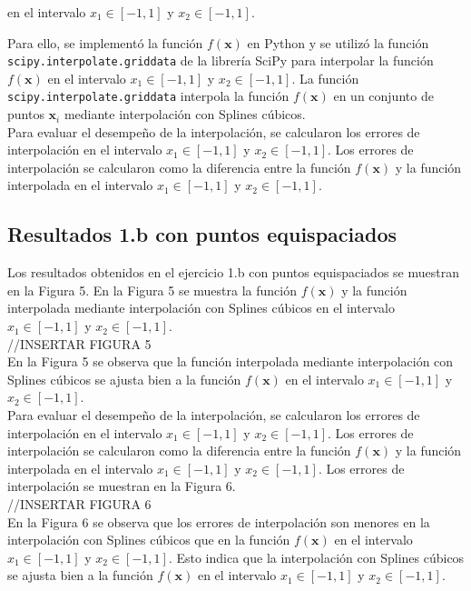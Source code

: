 en el intervalo $x_1 \in [-1, 1]$ y $x_2 \in [-1, 1]$.

Para ello, se implementó la función $f(\textbf{x})$ en Python y se utilizó la función \texttt{scipy.interpolate.griddata} de la librería SciPy para interpolar la función $f(\textbf{x})$ en el intervalo $x_1 \in [-1, 1]$ y $x_2 \in [-1, 1]$. 
La función \texttt{scipy.interpolate.griddata} interpola la función $f(\textbf{x})$ en un conjunto de puntos $\textbf{x}_i$ mediante interpolación con Splines cúbicos.\\
Para evaluar el desempeño de la interpolación, se calcularon los errores de interpolación en el intervalo $x_1 \in [-1, 1]$ y $x_2 \in [-1, 1]$. Los errores de interpolación se calcularon como la diferencia entre la función $f(\textbf{x})$ y la función interpolada en el intervalo $x_1 \in [-1, 1]$ y $x_2 \in [-1, 1]$.\\

\subsection{Resultados 1.b con puntos equispaciados}
Los resultados obtenidos en el ejercicio 1.b con puntos equispaciados se muestran en la Figura 5. En la Figura 5 se muestra la función $f(\textbf{x})$ y la función interpolada mediante interpolación con Splines cúbicos en el intervalo $x_1 \in [-1, 1]$ y $x_2 \in [-1, 1]$.\\
//INSERTAR FIGURA 5\\
En la Figura 5 se observa que la función interpolada mediante interpolación con Splines cúbicos se ajusta bien a la función $f(\textbf{x})$ en el intervalo $x_1 \in [-1, 1]$ y $x_2 \in [-1, 1]$.\\
Para evaluar el desempeño de la interpolación, se calcularon los errores de interpolación en el intervalo $x_1 \in [-1, 1]$ y $x_2 \in [-1, 1]$. Los errores de interpolación se calcularon como la diferencia entre la función $f(\textbf{x})$ y la función interpolada en el intervalo $x_1 \in [-1, 1]$ y $x_2 \in [-1, 1]$. Los errores de interpolación se muestran en la Figura 6.\\
//INSERTAR FIGURA 6\\
En la Figura 6 se observa que los errores de interpolación son menores en la interpolación con Splines cúbicos que en la función $f(\textbf{x})$ en el intervalo $x_1 \in [-1, 1]$ y $x_2 \in [-1, 1]$. Esto indica que la interpolación con Splines cúbicos se ajusta bien a la función $f(\textbf{x})$ en el intervalo $x_1 \in [-1, 1]$ y $x_2 \in [-1, 1]$.\\

